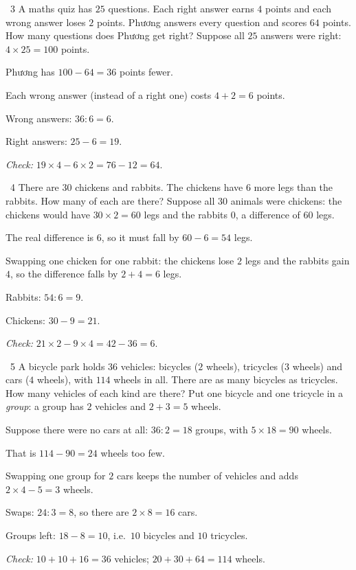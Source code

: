 \gap
\begin{exbox}{\ExWord\ 3}
A maths quiz has $25$ questions. Each right answer earns $4$ points and each wrong answer loses $2$ points. Phương answers every question and scores $64$ points. How many questions does Phương get right?
\guide
Suppose all $25$ answers were right: $4\times25=100$ points.\par
Phương has $100-64=36$ points fewer.\par
Each wrong answer (instead of a right one) costs $4+2=6$ points.\par
Wrong answers: $36:6=6$.\par Right answers: $25-6=19$.\par
\emph{Check:} $19\times4-6\times2=76-12=64$.
\end{exbox}
\gap
\begin{exbox}{\ExWord\ 4}
There are $30$ chickens and rabbits. The chickens have $6$ more legs than the rabbits. How many of each are there?
\guide
Suppose all $30$ animals were chickens: the chickens would have $30\times2=60$ legs and the rabbits $0$, a difference of $60$ legs.\par
The real difference is $6$, so it must fall by $60-6=54$ legs.\par
Swapping one chicken for one rabbit: the chickens lose $2$ legs and the rabbits gain $4$, so the difference falls by $2+4=6$ legs.\par
Rabbits: $54:6=9$.\par Chickens: $30-9=21$.\par
\emph{Check:} $21\times2-9\times4=42-36=6$.
\end{exbox}
\gap
\begin{exbox}{\ExWord\ 5}
A bicycle park holds $36$ vehicles: bicycles ($2$ wheels), tricycles ($3$ wheels) and cars ($4$ wheels), with $114$ wheels in all. There are as many bicycles as tricycles. How many vehicles of each kind are there?
\guide
Put one bicycle and one tricycle in a \emph{group}: a group has $2$ vehicles and $2+3=5$ wheels.\par
Suppose there were no cars at all: $36:2=18$ groups, with $5\times18=90$ wheels.\par
That is $114-90=24$ wheels too few.\par
Swapping one group for $2$ cars keeps the number of vehicles and adds $2\times4-5=3$ wheels.\par
Swaps: $24:3=8$, so there are $2\times8=16$ cars.\par
Groups left: $18-8=10$, i.e.\ $10$ bicycles and $10$ tricycles.\par
\emph{Check:} $10+10+16=36$ vehicles; $20+30+64=114$ wheels.
\end{exbox}
